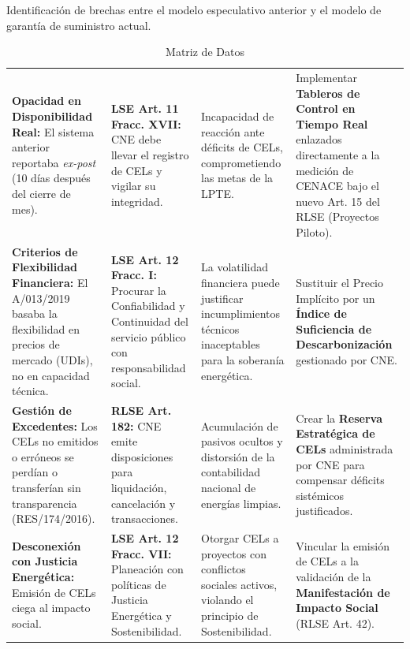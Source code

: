 \documentclass{cel}
\begin{document}
Identificación de brechas entre el modelo especulativo anterior y el modelo de garantía de suministro actual.


\vspace{0.3cm}
\begin{tabladoradoLargo}
\renewcommand{\tabularxcolumn}[1]{p{#1}}
\begin{xltabular}{\textwidth}{|X|X|X|X|}
\caption{Matriz de Datos} \\
\toprule
{}  &  &  &  \\
\midrule
\endhead
\textbf{Opacidad en Disponibilidad Real:} El sistema anterior reportaba \textit{ex-post} (10 días después del cierre de mes). & \textbf{LSE Art. 11 Fracc. XVII:} CNE debe llevar el registro de CELs y vigilar su integridad. & Incapacidad de reacción ante déficits de CELs, comprometiendo las metas de la LPTE. & Implementar \textbf{Tableros de Control en Tiempo Real} enlazados directamente a la medición de CENACE bajo el nuevo Art. 15 del RLSE (Proyectos Piloto). \\ \hline
\textbf{Criterios de Flexibilidad Financiera:} El A/013/2019 basaba la flexibilidad en precios de mercado (UDIs), no en capacidad técnica. & \textbf{LSE Art. 12 Fracc. I:} Procurar la Confiabilidad y Continuidad del servicio público con responsabilidad social. & La volatilidad financiera puede justificar incumplimientos técnicos inaceptables para la soberanía energética. & Sustituir el \textquotedbl{}Precio Implícito\textquotedbl{} por un \textbf{Índice de Suficiencia de Descarbonización} gestionado por CNE. \\ \hline
\textbf{Gestión de Excedentes:} Los CELs no emitidos o erróneos se perdían o transferían sin transparencia (RES/174/2016). & \textbf{RLSE Art. 182:} CNE emite disposiciones para liquidación, cancelación y transacciones. & Acumulación de pasivos ocultos y distorsión de la contabilidad nacional de energías limpias. & Crear la \textbf{Reserva Estratégica de CELs} administrada por CNE para compensar déficits sistémicos justificados. \\ \hline
\textbf{Desconexión con Justicia Energética:} Emisión de CELs ciega al impacto social. & \textbf{LSE Art. 12 Fracc. VII:} Planeación con políticas de Justicia Energética y Sostenibilidad. & Otorgar CELs a proyectos con conflictos sociales activos, violando el principio de Sostenibilidad. & Vincular la emisión de CELs a la validación de la \textbf{Manifestación de Impacto Social} (RLSE Art. 42). \\ \hline
\bottomrule
\end{xltabular}
\end{tabladoradoLargo}
\end{document}
